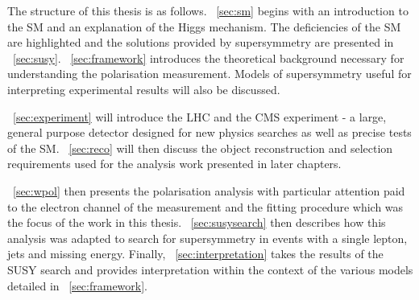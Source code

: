 The structure of this thesis is as follows. \chap~\ref{sec:sm} begins with an
introduction to the \ac{SM} and an explanation of the Higgs mechanism. The
deficiencies of the \ac{SM} are highlighted and the solutions provided by
supersymmetry are presented in
\chap~\ref{sec:susy}. \chap~\ref{sec:framework} introduces the theoretical
background necessary for understanding the \PW polarisation measurement. Models
of supersymmetry useful for interpreting experimental results will also be
discussed.

\chap~\ref{sec:experiment} will introduce the \ac{LHC} and the \ac{CMS}
experiment - a large, general purpose detector designed for new physics searches
as well as precise tests of the \ac{SM}. \chap~\ref{sec:reco} will then
discuss the object reconstruction and selection requirements used for the
analysis work presented in later chapters.

\chap~\ref{sec:wpol} then presents the \PW polarisation analysis with
particular attention paid to the electron channel of the measurement and the
fitting procedure which was the focus of the work in this
thesis. \chap~\ref{sec:susysearch} then describes how this analysis was
adapted to search for supersymmetry in events with a single lepton, jets and
missing energy. Finally, \chap~\ref{sec:interpretation} takes the results of
the \ac{SUSY} search and provides interpretation within the context of the
various models detailed in \chap~\ref{sec:framework}.
